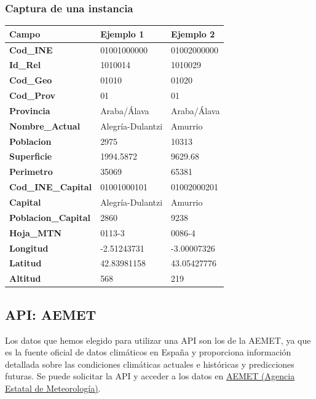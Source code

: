 \documentclass[12pt, a4paper]{article}
\begin{document}
\subsubsection*{Captura de una instancia}
\begin{center}
\begin{tabular}{|p{}|p{}|p{}|}
\hline
\textbf{Campo} & \textbf{Ejemplo 1} & \textbf{Ejemplo 2} \\
\hline
\textbf{Cod\_INE} & 01001000000 & 01002000000 \\
\textbf{Id\_Rel} & 1010014 & 1010029 \\
\textbf{Cod\_Geo} & 01010 & 01020 \\
\textbf{Cod\_Prov} & 01 & 01 \\
\textbf{Provincia} & Araba/Álava & Araba/Álava \\
\textbf{Nombre\_Actual} & Alegría-Dulantzi & Amurrio \\
\textbf{Poblacion} & 2975 & 10313 \\
\textbf{Superficie} & 1994.5872 & 9629.68 \\
\textbf{Perimetro} & 35069 & 65381 \\
\textbf{Cod\_INE\_Capital} & 01001000101 & 01002000201 \\
\textbf{Capital} & Alegría-Dulantzi & Amurrio \\
\textbf{Poblacion\_Capital} & 2860 & 9238 \\
\textbf{Hoja\_MTN} & 0113-3 & 0086-4 \\
\textbf{Longitud} & -2.51243731 & -3.00007326 \\
\textbf{Latitud} & 42.83981158 & 43.05427776 \\
\textbf{Altitud} & 568 & 219 \\
\hline
\end{tabular}
\end{center}

\subsection{API: AEMET}
Los datos que hemos elegido para utilizar una API son los de la AEMET, ya que es la fuente oficial de datos climáticos en España y proporciona información detallada sobre las condiciones climáticas actuales e históricas y predicciones futuras.
Se puede solicitar la API y acceder a los datos en \href{https://opendata.aemet.es/centrodedescargas/inicio}{AEMET (Agencia Estatal de Meteorología)}.
\end{document}
